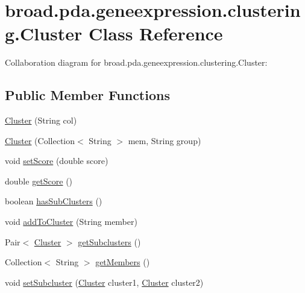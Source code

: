 \hypertarget{classbroad_1_1pda_1_1geneexpression_1_1clustering_1_1_cluster}{\section{broad.\+pda.\+geneexpression.\+clustering.\+Cluster Class Reference}
\label{classbroad_1_1pda_1_1geneexpression_1_1clustering_1_1_cluster}
}


Collaboration diagram for broad.\+pda.\+geneexpression.\+clustering.\+Cluster\+:
\subsection*{Public Member Functions}
\begin{DoxyCompactItemize}
\item 
\hyperlink{classbroad_1_1pda_1_1geneexpression_1_1clustering_1_1_cluster_aa7aac9aa7b19ceef6e3959d895002c83}{Cluster} (String col)
\item 
\hyperlink{classbroad_1_1pda_1_1geneexpression_1_1clustering_1_1_cluster_a2c8ead61cf0150c957136052226249d8}{Cluster} (Collection$<$ String $>$ mem, String group)
\item 
void \hyperlink{classbroad_1_1pda_1_1geneexpression_1_1clustering_1_1_cluster_a6fbec99c17be7b4cbf4fbe461f214e12}{set\+Score} (double score)
\item 
double \hyperlink{classbroad_1_1pda_1_1geneexpression_1_1clustering_1_1_cluster_aee0b7c8eeca7c5aa03efc1e130bd173d}{get\+Score} ()
\item 
boolean \hyperlink{classbroad_1_1pda_1_1geneexpression_1_1clustering_1_1_cluster_adc69b6c944f3defaa380f142c4aacca9}{has\+Sub\+Clusters} ()
\item 
void \hyperlink{classbroad_1_1pda_1_1geneexpression_1_1clustering_1_1_cluster_a561f6301e67f047121d9a2df7bc23bf1}{add\+To\+Cluster} (String member)
\item 
Pair$<$ \hyperlink{classbroad_1_1pda_1_1geneexpression_1_1clustering_1_1_cluster}{Cluster} $>$ \hyperlink{classbroad_1_1pda_1_1geneexpression_1_1clustering_1_1_cluster_ad35ffe1b453cfec9527792ffd369f7f7}{get\+Subclusters} ()
\item 
Collection$<$ String $>$ \hyperlink{classbroad_1_1pda_1_1geneexpression_1_1clustering_1_1_cluster_ace59db59ddd5fee84c54b0b37a2aa5a7}{get\+Members} ()
\item 
void \hyperlink{classbroad_1_1pda_1_1geneexpression_1_1clustering_1_1_cluster_a0adc67b078b169fa6c9e54111589e42c}{set\+Subcluster} (\hyperlink{classbroad_1_1pda_1_1geneexpression_1_1clustering_1_1_cluster}{Cluster} cluster1, \hyperlink{classbroad_1_1pda_1_1geneexpression_1_1clustering_1_1_cluster}{Cluster} cluster2)

\end{DoxyCompactItemize}
